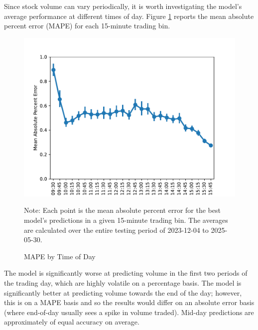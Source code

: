 \documentclass[12pt]{article}
\begin{document}
Since stock volume can vary periodically, it is worth investigating the model's average performance at different times of day. Figure \ref{fig:mape_by_time} reports the mean absolute percent error (MAPE) for each 15-minute trading bin.
\begin{figure}[H]
    \centering
    \caption{MAPE by Time of Day}
    \includegraphics[width=0.75\linewidth]{../Output/mape_by_time.pdf}
    \begin{minipage}{0.75\linewidth}
        \footnotesize
        \singlespacing
        Note: Each point is the mean absolute percent error for the best model's predictions in a given 15-minute trading bin. The averages are calculated over the entire testing period of 2023-12-04 to 2025-05-30.
    \end{minipage}
    \label{fig:mape_by_time}
\end{figure}
The model is significantly worse at predicting volume in the first two periods of the trading day, which are highly volatile on a percentage basis. The model is significantly better at predicting volume towards the end of the day; however, this is on a MAPE basis and so the results would differ on an absolute error basis (where end-of-day usually sees a spike in volume traded). Mid-day predictions are approximately of equal accuracy on average.
\end{document}
